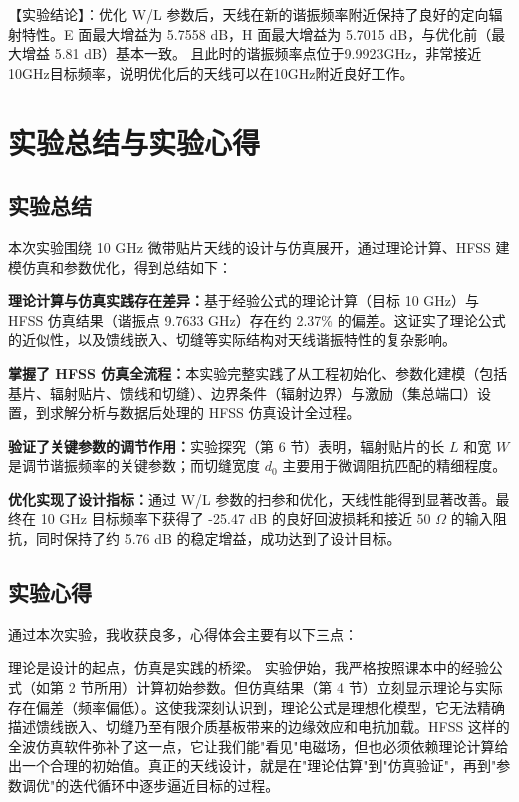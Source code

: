 \documentclass[12pt,a4paper,UTF8]{article}
\begin{document}
【实验结论】：优化 W/L 参数后，天线在新的谐振频率附近保持了良好的定向辐射特性。E 面最大增益为 5.7558 dB，H 面最大增益为 5.7015 dB，与优化前（最大增益 5.81 dB）基本一致。
且此时的谐振频率点位于9.9923GHz，非常接近10GHz目标频率，说明优化后的天线可以在10GHz附近良好工作。
\section{实验总结与实验心得}

\subsection{实验总结}

本次实验围绕 10 GHz 微带贴片天线的设计与仿真展开，通过理论计算、HFSS 建模仿真和参数优化，得到总结如下：

\textbf{理论计算与仿真实践存在差异：}基于经验公式的理论计算（目标 10 GHz）与 HFSS 仿真结果（谐振点 9.7633 GHz）存在约 2.37\% 的偏差。这证实了理论公式的近似性，以及馈线嵌入、切缝等实际结构对天线谐振特性的复杂影响。

\textbf{掌握了 HFSS 仿真全流程：}本实验完整实践了从工程初始化、参数化建模（包括基片、辐射贴片、馈线和切缝）、边界条件（辐射边界）与激励（集总端口）设置，到求解分析与数据后处理的 HFSS 仿真设计全过程。

\textbf{验证了关键参数的调节作用：}实验探究（第 6 节）表明，辐射贴片的长 $L$ 和宽 $W$ 是调节谐振频率的关键参数；而切缝宽度 $d_0$ 主要用于微调阻抗匹配的精细程度。

\textbf{优化实现了设计指标：}通过 W/L 参数的扫参和优化，天线性能得到显著改善。最终在 10 GHz 目标频率下获得了 -25.47 dB 的良好回波损耗和接近 50 $\Omega$ 的输入阻抗，同时保持了约 5.76 dB 的稳定增益，成功达到了设计目标。

\subsection{实验心得}

通过本次实验，我收获良多，心得体会主要有以下三点：

{\heiti 理论是设计的起点，仿真是实践的桥梁。}{ 实验伊始，我严格按照课本中的经验公式（如第 2 节所用）计算初始参数。}但仿真结果（第 4 节）立刻显示理论与实际存在偏差（频率偏低）。这使我深刻认识到，理论公式是理想化模型，它无法精确描述馈线嵌入、切缝乃至有限介质基板带来的边缘效应和电抗加载。HFSS 这样的全波仿真软件弥补了这一点，它让我们能"看见"电磁场，但也必须依赖理论计算给出一个合理的初始值。真正的天线设计，就是在"理论估算"到"仿真验证"，再到"参数调优"的迭代循环中逐步逼近目标的过程。
\end{document}

